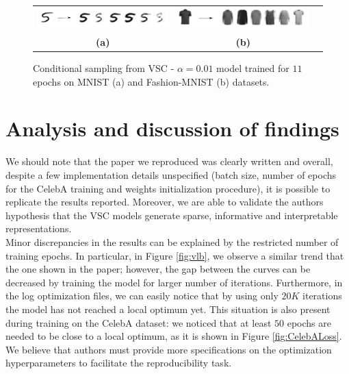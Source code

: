 \begin{figure}[!h]
    \captionsetup{justification=centering,margin=2cm}
    \centering
    \begin{tabular}{ccc}
    \includegraphics[width=.45\textwidth]{figures/mnist_conditional} &
    \includegraphics[width=.45\textwidth]{figures/mnist_fashion_conditional} \\
    \textbf{(a)}  & \textbf{(b)}   \\[6pt]
\end{tabular}
    \centering
    \caption{Conditional sampling from VSC - $\alpha = 0.01$ model trained for $11$ epochs on MNIST (a) and Fashion-MNIST (b) datasets.}
    \label{fig:conditional}
\end{figure}


\section{Analysis and discussion of findings}
\label{insights}

We should note that the paper we reproduced was clearly written and overall, despite a few implementation details unspecified (batch size, number of epochs for the CelebA training and weights initialization procedure), it is possible to replicate the results reported. Moreover, we are able to validate the authors hypothesis that the VSC models generate sparse, informative and interpretable representations. \\

Minor discrepancies in the results can be explained by the restricted number of training epochs. In particular, in Figure \ref{fig:vlb}, we observe a similar trend that the one shown in the paper; however, the gap between the curves can be decreased by training the model for larger number of iterations. Furthermore, in the log optimization files, we can easily notice that by using only $20K$ iterations the model has not reached a local optimum yet.  This situation is also present during training on the CelebA dataset: we noticed that at least $50$ epochs are needed to be close to a local optimum, as it is shown in Figure \ref{fig:CelebALoss}. We believe that authors must provide more specifications on the optimization hyperparameters to facilitate the reproducibility task.

